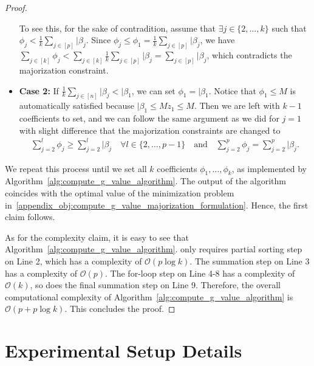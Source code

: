 \begin{proof}
\begin{itemize}[label=$\diamond$,leftmargin=*]
    To see this, for the sake of contradition, assume that $\exists j \in \{2, \ldots, k\}$ such that $\phi_j < \frac{1}{k} \sum_{j \in [p]} \vert{\beta_j}$. 
    Since $\phi_j \leq \phi_1 = \frac{1}{k} \sum_{j \in [p]} \vert{\beta_j}$, we have $\sum_{j \in [k]} \phi_j < \sum_{j \in [k]} \frac{1}{k} \sum_{j \in [p]} \vert{\beta_j} = \sum_{j \in [p]} \vert{\beta_j}$, which contradicts the majorization constraint.

    \item \textbf{Case 2:} If $\frac{1}{k} \sum_{j \in [n]} \vert{\beta_j} < \vert{\beta_1}$, we can set $\phi_1 = \vert{\beta_1}$. Notice that $\phi_1 \leq M$ is automatically satisfied because $\vert{\beta_1} \leq M z_1 \leq M$.
    Then we are left with $k-1$ coefficients to set, and we can follow the same argument as we did for $j=1$ with slight difference that the majorization constraints are changed to
    \begin{align*}
        \textstyle
        \sum_{j=2}^l \phi_j \geq \sum_{j=2}^l \vert{\beta_j} \quad \forall l \in \{2, \ldots, p-1\} \quad \text{and} \quad \sum_{j=2}^p \phi_j = \sum_{j=2}^p \vert{\beta_j}.
    \end{align*}
\end{itemize}
We repeat this process until we set all $k$ coefficients $\phi_1, \ldots, \phi_k$, as implemented by Algorithm~\ref{alg:compute_g_value_algorithm}.
The output of the algorithm coincides with the optimal value of the minimization problem in~\eqref{appendix_obj:compute_g_value_majorization_formulation}. Hence, the first claim follows.

As for the complexity claim, it is easy to see that Algorithm~\ref{alg:compute_g_value_algorithm}.
only requires partial sorting step on Line 2, which has a complexity of $\mathcal O(p \log k)$. The summation step on Line 3 has a complexity of $\mathcal O(p)$. The for-loop step on Line 4-8 has a complexity of $\mathcal O(k)$, so does the final summation step on Line 9. Therefore, the overall computational complexity of Algorithm~\ref{alg:compute_g_value_algorithm} is $\mathcal O(p + p \log k)$. This concludes the proof.
\end{proof}

\newpage
\section{Experimental Setup Details}
\label{appendix:experimental_setup}

